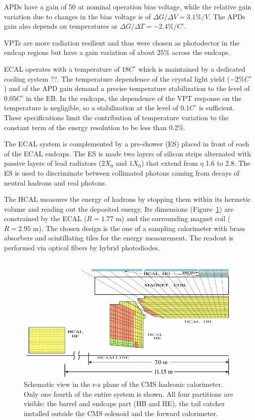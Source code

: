 APDs have a gain of 50 at nominal operation bias voltage, while the relative gain variation due to changes in the bias voltage
is of $\Delta G/\Delta V = 3.1\% /V$. The APDs gain also depends on temperatures as
$\Delta G/\Delta T = -2.4\% /C^{\circ}$. 

VPTs are more radiation resilient and thus were chosen as photodector in the endcap regions
but have a gain variation of about $25\%$ across the endcaps.

ECAL operates with a temperature of $18 C^{\circ}$ which is maintained by a dedicated cooling system ??.
The temperature dependence of the crystal light yield ($−2\% C^{\circ}$) and of the APD gain
demand a precise temperature stabilization to the level of $0.05 C^{\circ}$ in the EB. In the
endcaps, the dependence of the VPT response on the temperature is negligible,
so a stabilization at the level of $0.1 C^{\circ}$ is sufficient. These specifications limit the contribution
of temperature variation to the constant term of the energy resolution to be less than 0.2$\%$.

The ECAL system is complemented by a pre-shower (ES) placed in front of each of the ECAL endcaps.
The ES is made two layers of silicon strips alternated with passive layers of lead radiators ($2 X_0$ and $1 X_0$)
that extend from $\eta$ 1.6 to 2.8.
The ES is used to discriminate between collimated photons caming from decays of neutral hadrons and
real photons.


The HCAL measures the energy of hadrons by stopping them within its
hermetic volume and reading out the deposited energy. Its dimensions (Figure~\ref{fig:cms_hcal_layout})
are constrained by the ECAL ($R = 1.77$ m) and the surrounding magnet coil
($R = 2.95$ m). The chosen design is the one of a sampling calorimeter with brass absorbers
and scintillating tiles for the energy measurement. The readout is performed via
optical fibers by hybrid photodiodes.

\begin{figure}
  \centering
  \includegraphics[width = 1.\textwidth]{figures/cms/hcal_layout.png}
  \caption{Schematic view in the r-z plane of the CMS hadronic calorimeter. Only one fourth of the
    entire system is shown. All four partitions are visible: the barrel and endcaps part (HB and HE), the
    tail catcher installed outside the CMS solenoid and the forward calorimeter.}
  \label{fig:cms_hcal_layout}
\end{figure}    

